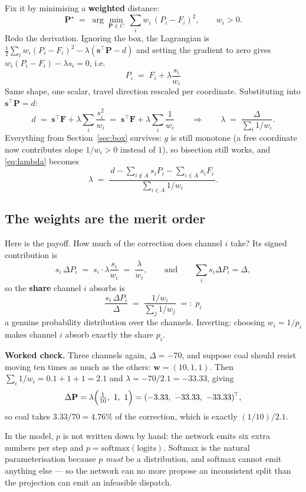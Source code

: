 \documentclass[11pt]{article}
\newcommand{\s}{\mathbf{s}}
\newcommand{\F}{\mathbf{F}}
\newcommand{\Pv}{\mathbf{P}}
\begin{document}
Fix it by minimising a \textbf{weighted} distance:
\[
  \Pv^\star \;=\; \arg\min_{\Pv \in C} \ \sum_{i} w_i \,(P_i - F_i)^2,
  \qquad w_i > 0 .
\]
Redo the derivation. Ignoring the box, the Lagrangian is
$\tfrac12\sum_i w_i (P_i-F_i)^2 - \lambda(\s^{\!\top}\Pv - d)$ and setting the
gradient to zero gives $w_i (P_i - F_i) - \lambda s_i = 0$, i.e.
\[
  \boxed{\;P_i \;=\; F_i + \lambda \frac{s_i}{w_i}\;}
\]
Same shape, one scalar, travel direction rescaled per coordinate. Substituting
into $\s^{\!\top}\Pv = d$:
\[
  d \;=\; \s^{\!\top}\F + \lambda \sum_i \frac{s_i^2}{w_i}
      \;=\; \s^{\!\top}\F + \lambda \sum_i \frac{1}{w_i}
  \qquad\Longrightarrow\qquad
  \lambda \;=\; \frac{\Delta}{\sum_i 1/w_i}.
\]
Everything from Section~\ref{sec:box} survives: $g$ is still monotone (a free
coordinate now contributes slope $1/w_i > 0$ instead of $1$), so bisection still
works, and \eqref{eq:lambda} becomes
\begin{equation}
  \lambda \;=\;
  \frac{\,d - \sum_{i\notin A} s_i P_i - \sum_{i\in A} s_i F_i\,}
       {\sum_{i \in A} 1/w_i}.
\label{eq:lambdaw}
\end{equation}

\subsection*{The weights are the merit order}

Here is the payoff. How much of the correction does channel $i$ take? Its signed
contribution is
\[
  s_i \,\Delta P_i \;=\; s_i \cdot \lambda\frac{s_i}{w_i} \;=\; \frac{\lambda}{w_i},
  \qquad\text{and}\qquad
  \sum_i s_i \Delta P_i = \Delta,
\]
so the \textbf{share} channel $i$ absorbs is
\[
  \boxed{\;
  \frac{s_i\,\Delta P_i}{\Delta} \;=\; \frac{1/w_i}{\sum_j 1/w_j} \;=:\; p_i \;}
\]
a genuine probability distribution over the channels. Inverting: choosing
$w_i = 1/p_i$ makes channel $i$ absorb exactly the share $p_i$.

\medskip\noindent
\textbf{Worked check.} Three channels again, $\Delta = -70$, and suppose coal
should resist moving ten times as much as the others: $\mathbf{w} = (10,1,1)$.
Then $\sum_i 1/w_i = 0.1 + 1 + 1 = 2.1$ and $\lambda = -70/2.1 = -33.33$, giving
\[
  \Delta\Pv = \lambda\Bigl(\tfrac{1}{10},\ 1,\ 1\Bigr)
            = (-3.33,\ -33.33,\ -33.33)^{\!\top},
\]
so coal takes $3.33/70 = 4.76\%$ of the correction, which is exactly
$(1/10)/2.1$. \checkmark

\medskip\noindent
In the model, $p$ is not written down by hand: the network emits six extra
numbers per step and $p = \mathrm{softmax}(\text{logits})$. Softmax is the
natural parameterisation because $p$ \emph{must} be a distribution, and softmax
cannot emit anything else --- so the network can no more propose an inconsistent
split than the projection can emit an infeasible dispatch.
\end{document}
